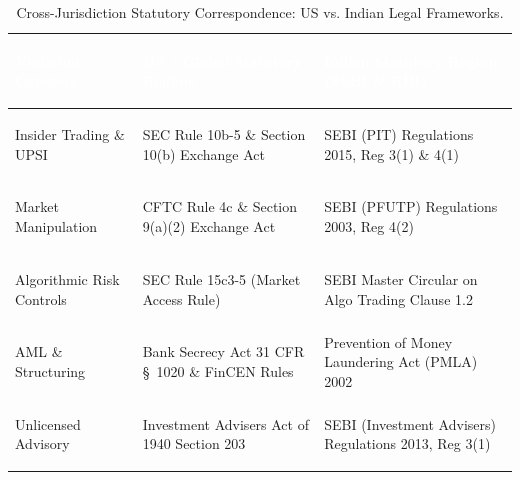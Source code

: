 \documentclass[11pt,a4paper]{article}
\begin{document}
\begin{table}[H]
\centering
\small
\begin{tabularx}{\textwidth}{>{\bfseries\raggedright\arraybackslash}p{3.5cm} >{\raggedright\arraybackslash}p{5.5cm} >{\raggedright\arraybackslash}X}
\toprule
\rowcolor{tableheader} \textcolor{white}{Violation Category} & \textcolor{white}{US / Global Statutory Regime} & \textcolor{white}{Indian Statutory Regime (SEBI \& RBI)} \\
\midrule
Insider Trading \& UPSI & SEC Rule 10b-5 \& Section 10(b) Exchange Act & SEBI (PIT) Regulations 2015, Reg 3(1) \& 4(1) \\
Market Manipulation & CFTC Rule 4c \& Section 9(a)(2) Exchange Act & SEBI (PFUTP) Regulations 2003, Reg 4(2) \\
Algorithmic Risk Controls & SEC Rule 15c3-5 (Market Access Rule) & SEBI Master Circular on Algo Trading Clause 1.2 \\
AML \& Structuring & Bank Secrecy Act 31 CFR \S~1020 \& FinCEN Rules & Prevention of Money Laundering Act (PMLA) 2002 \\
Unlicensed Advisory & Investment Advisers Act of 1940 Section 203 & SEBI (Investment Advisers) Regulations 2013, Reg 3(1) \\
\bottomrule
\end{tabularx}
\caption{Cross-Jurisdiction Statutory Correspondence: US vs. Indian Legal Frameworks.}
\label{tab:statutory_mapping}
\end{table}
\end{document}
